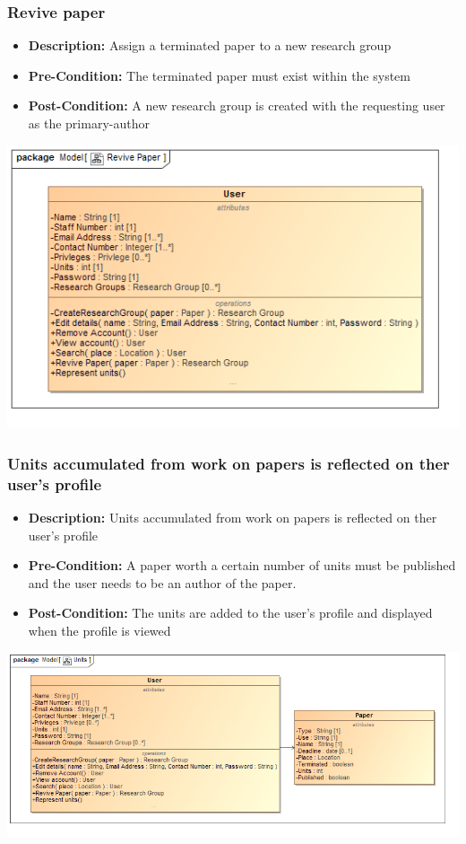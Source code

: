 \documentclass[11pt]{article}
\begin{document}
		\subsubsection{Revive paper}
		\begin{itemize}
			\item \textbf{Description: }Assign a terminated paper to a new research group
			\item \textbf{Pre-Condition: }The terminated paper must exist within the system
			\item \textbf{Post-Condition: }A new research group is created with the requesting user as the primary-author
		\end{itemize}
		\begin{center}
			\includegraphics[width=\textwidth]{../Diagrams/DomainModel/RevivePaper.png}\\[0.5cm]
		\end{center}
		\newpage
		\subsubsection{Units accumulated from work on papers is reflected on ther user's profile}
		\begin{itemize}
			\item \textbf{Description: }Units accumulated from work on papers is reflected on ther user's profile
			\item \textbf{Pre-Condition: }A paper worth a certain number of units must be published and the user needs to be an author of the paper.
			\item \textbf{Post-Condition: }The units are added to the user's profile and displayed when the profile is viewed
		\end{itemize}
		\begin{center}
			\includegraphics[width=\textwidth]{../Diagrams/DomainModel/Units.png}\\[0.5cm]
		\end{center}
		\newpage
\end{document}

